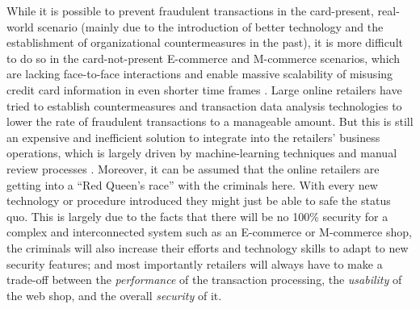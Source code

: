 While it is possible to prevent fraudulent transactions in the card-present, real-world scenario (mainly due to the introduction of better technology and the establishment of organizational countermeasures in the past), it is more difficult to do so in the card-not-present \gls{E-commerce} and \gls{M-commerce} scenarios, which are lacking face-to-face interactions and enable massive scalability of misusing credit card information in even shorter time frames \citep{Lewis2015}. Large online retailers have tried to establish countermeasures and transaction data analysis technologies to lower the rate of fraudulent transactions to a manageable amount. But this is still an expensive and inefficient solution to integrate into the retailers’ business operations, which is largely driven by machine-learning techniques and manual review processes \citep{Brachmann2015}. Moreover, it can be assumed that the online retailers are getting into a ``Red Queen's race'' with the criminals here. With every new technology or procedure introduced they might just be able to safe the status quo. This is largely due to the facts that there will be no 100\% security for a complex and interconnected system such as an \gls{E-commerce} or \gls{M-commerce} shop, the criminals will also increase their efforts and technology skills to adapt to new security features; and most importantly retailers will always have to make a trade-off between the \emph{performance} of the transaction processing, the \emph{usability} of the web shop, and the overall \emph{security} of it.

